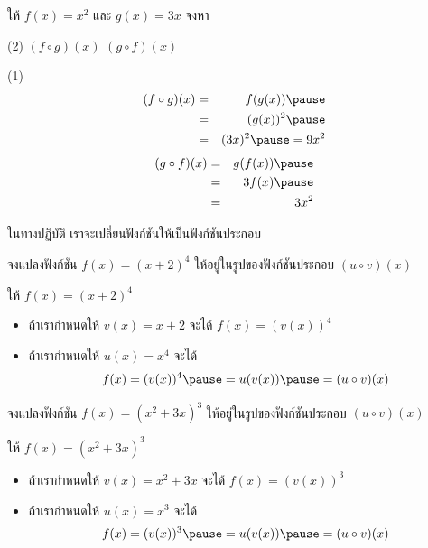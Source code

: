 \begin{frame}[t]
\begin{ex}
ให้ $f(x) = x^2$ และ $g(x) = 3x$ จงหา 
\begin{tasks}(2)
\task $(f \circ g)(x)$ 
\task $(g \circ f)(x)$
\end{tasks}
\end{ex}
\begin{sol}
\begin{tasks}(1)
\task
\begin{eqnarray*}
(f \circ g)(x) &=& f(g(x)) \pause \\
&=& (g(x))^2 \pause \\
&=& (3x)^2 \pause = 9x^2
\end{eqnarray*}  \pause
\task
\begin{eqnarray*}
(g \circ f)(x) &=& g(f(x)) \pause \\
&=& 3f(x) \pause \\
&=& 3x^2
\end{eqnarray*}
\end{tasks}
\end{sol}
\end{frame}


\begin{frame}[t]
ในทางปฏิบัติ เราจะเปลี่ยนฟังก์ชันให้เป็นฟังก์ชันประกอบ \pause
\begin{ex}
จงแปลงฟังก์ชัน $f(x) = (x+2)^4$ ให้อยู่ในรูปของฟังก์ชันประกอบ $(u \circ v)(x)$
\end{ex}
\begin{sol}
ให้ $f(x) = (x+2)^4$ \pause 
\begin{itemize}
\item ถ้าเรากำหนดให้ $v(x) = x +2$ \pause จะได้ $f(x) = (v(x))^4$ \pause
\item ถ้าเรากำหนดให้ $u(x) = x^4$ \pause จะได้ 
\[ f(x) = (v(x))^4 \pause = u(v(x)) \pause = (u \circ v)(x)\]
\end{itemize}
\end{sol}
\end{frame}


\begin{frame}[t]
\begin{ex}
จงแปลงฟังก์ชัน $f(x) = (x^2+3x)^3$ ให้อยู่ในรูปของฟังก์ชันประกอบ $(u \circ v)(x)$
\end{ex}
\begin{sol}
ให้ $f(x) = (x^2+3x)^3$ \pause 
\begin{itemize}
\item ถ้าเรากำหนดให้ $v(x) = x^2+3x$ \pause จะได้ $f(x) = (v(x))^3$ \pause 
\item ถ้าเรากำหนดให้ $u(x) = x^3$ \pause จะได้ 
\[ f(x) = (v(x))^3 \pause = u(v(x)) \pause = (u \circ v)(x)\]
\end{itemize}
\end{sol}
\end{frame}


